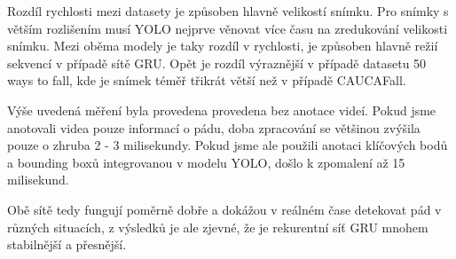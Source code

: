 Rozdíl rychlosti mezi datasety je způsoben hlavně velikostí snímku. Pro snímky
s větším rozlišením musí YOLO nejprve věnovat více času na zredukování
velikosti snímku. Mezi oběma modely je taky rozdíl v rychlosti, je způsoben
hlavně režií sekvencí v případě sítě GRU. Opět je rozdíl výraznější v případě
datasetu 50 ways to fall, kde je snímek téměř třikrát větší než v případě
CAUCAFall. 

Výše uvedená měření byla provedena provedena bez anotace videí. Pokud jsme
anotovali videa pouze informací o pádu, doba zpracování se většinou zvýšila
pouze o zhruba 2 - 3 milisekundy. Pokud jsme ale použili anotaci klíčových bodů
a bounding boxů integrovanou v modelu YOLO, došlo k zpomalení až 15 milisekund. 



Obě sítě tedy fungují poměrně dobře a dokážou v reálném čase detekovat pád v různých
situacích, z výsledků je ale zjevné, že je rekurentní síť GRU mnohem
stabilnější a přesnější.